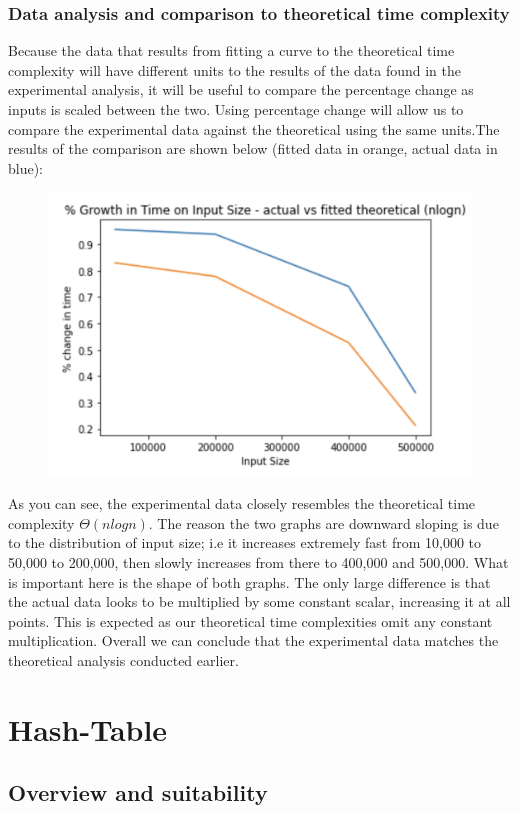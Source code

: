 \documentclass[11p]{article}
\begin{document}
\subsubsection{Data analysis and comparison to theoretical time complexity}

Because the data that results from fitting a curve to the theoretical time complexity will have different units to the results of the data found in the experimental analysis, it will be useful to compare the percentage change as inputs is scaled between the two. Using percentage change will allow us to compare the experimental data against the theoretical using the same units.The results of the comparison are shown below (fitted data in orange, actual data in blue):

\begin{figure}[hbt!]
	\centering
	\includegraphics[width=0.4\linewidth]{experimental_results/sortComp.png}
\end{figure}

As you can see, the experimental data closely resembles the theoretical time complexity $\Theta(nlogn)$. The reason the two graphs are downward sloping is due to the distribution of input size; i.e it increases extremely fast from 10,000 to 50,000 to 200,000, then slowly increases from there to 400,000 and 500,000. What is important here is the shape of both graphs. The only large difference is that the actual data looks to be multiplied by some constant scalar, increasing it at all points. This is expected as our theoretical time complexities omit any constant multiplication. Overall we can conclude that the experimental data matches the theoretical analysis conducted earlier.

\pagebreak


\section{Hash-Table}
\subsection{Overview and suitability}
\end{document}
